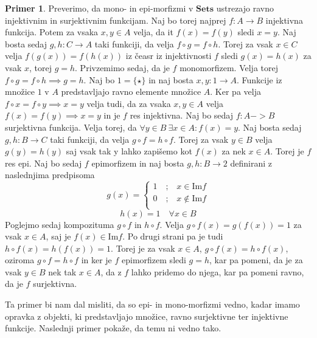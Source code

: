 \documentclass[12pt,a4paper]{book}
\theoremstyle{definition}
\theoremstyle{plain}
\theoremstyle{definition}
\newtheorem{primer}{Primer}[section]
\theoremstyle{remark}
\newcommand{\cat}[1]{\textbf{#1}}
\begin{document}
\begin{primer}
Preverimo, da mono- in epi-morfizmi v $\cat{Sets}$ ustrezajo ravno injektivnim in surjektivnim funkcijam. Naj bo torej najprej $f : A \to B$ injektivna funkcija. Potem za vsaka $x,y \in A$ velja, da it $f(x) = f(y)$ sledi $x = y$. Naj bosta sedaj $g,h : C \to A$ taki funkciji, da velja $f \circ g = f \circ h$. Torej za vsak $x \in C$ velja $f(g(x)) = f(h(x))$ iz čeasr iz injektivnosti $f$ sledi $g(x) = h(x)$ za vsak $x$, torej $g = h$. Privzemimo sedaj, da je $f$ monomorfizem. Velja torej $f \circ g = f \circ h \implies g = h$. Naj bo $1 = \{\star\}$ in naj bosta $x,y : 1 \to A$. Funkcije iz množice $1$ v $A$ predstavljajo ravno elemente množice $A$. Ker pa velja $f \circ x = f \circ y \implies x = y$ velja tudi, da za vsaka $x,y \in A$ velja $f(x) = f(y) \implies x = y$ in je $f$ res injektivna. Naj bo sedaj $f : A -> B$ surjektivna funkcija. Velja torej, da $\forall y \in B \ \exists x \in A : f(x) = y$. Naj bosta sedaj $g,h : B \to C$ taki funkciji, da velja $g \circ f = h \circ f$. Torej za vsak $y \in B$ velja $g(y) = h(y)$ saj vsak tak y lahko zapišemo kot $f(x)$ za nek $x \in A$. Torej je $f$ res epi. Naj bo sedaj $f$ epimorfizem in naj bosta $g,h : B \to 2$ definirani z naslednjima predpisoma
\[
g(x)=
\begin{cases}
1 \quad\text{;}\quad x \in \mathrm{Im}f \\
0 \quad\text{;}\quad x \notin \mathrm{Im}f \\
\end{cases}
\]
$$ h(x) = 1 \quad \forall x \in B $$
Poglejmo sedaj kompozituma $g \circ f$ in $h \circ f$. Velja $g \circ f(x) = g(f(x)) = 1$ za vsak $x \in A$, saj je $f(x) \in \mathrm{Im}f$. Po drugi strani pa je tudi $h \circ f(x) = h(f(x)) = 1$. Torej je za vsak $x \in A$, $g \circ f(x) = h \circ f(x)$, oziroma $g\circ f = h\circ f$ in ker je $f$ epimorfizem sledi $g = h$, kar pa pomeni, da je za vsak $y \in B$ nek tak $x \in A$, da z $f$ lahko pridemo do njega, kar pa pomeni ravno, da je $f$ surjektivna.
\end{primer}

Ta primer bi nam dal misliti, da so epi- in mono-morfizmi vedno, kadar imamo opravka z objekti, ki predstavljajo množice, ravno surjektivne ter injektivne funkcije. Naslednji primer pokaže, da temu ni vedno tako.
\end{document}
